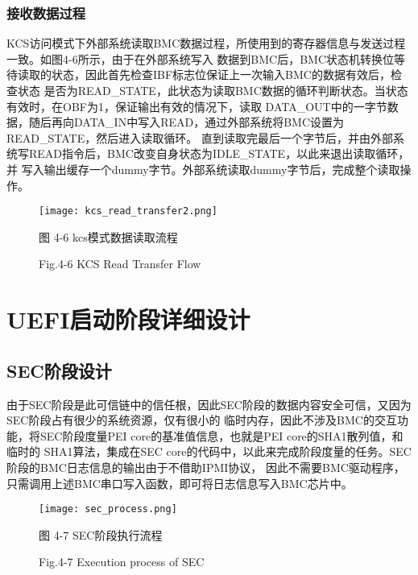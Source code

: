 \subsubsection{接收数据过程}
KCS访问模式下外部系统读取BMC数据过程，所使用到的寄存器信息与发送过程一致。如图4-6所示，由于在外部系统写入
数据到BMC后，BMC状态机转换位等待读取的状态，因此首先检查IBF标志位保证上一次输入BMC的数据有效后，检查状态
是否为READ\_STATE，此状态为读取BMC数据的循环判断状态。当状态有效时，在OBF为1，保证输出有效的情况下，读取
DATA\_OUT中的一字节数据，随后再向DATA\_IN中写入READ，通过外部系统将BMC设置为READ\_STATE，然后进入读取循环。
直到读取完最后一个字节后，并由外部系统写READ指令后，BMC改变自身状态为IDLE\_STATE，以此来退出读取循环，并
写入输出缓存一个dummy字节。外部系统读取dummy字节后，完成整个读取操作。

\begin{figure}[H]
    \vspace{0cm}   
    \setlength{\abovecaptionskip}{0.3cm}
	\centering
    \texttt{[image: kcs\_read\_transfer2.png]}
    \caption*{图 4-6 kcs模式数据读取流程}
    \setlength{\belowcaptionskip}{-0.7cm}
    \caption*{Fig.4-6 KCS Read Transfer Flow}
\end{figure}

%
%
\section{UEFI启动阶段详细设计}

\subsection{SEC阶段设计}
由于SEC阶段是此可信链中的信任根，因此SEC阶段的数据内容安全可信，又因为SEC阶段占有很少的系统资源，仅有很小的
临时内存，因此不涉及BMC的交互功能，将SEC阶段度量PEI core的基准值信息，也就是PEI core的SHA1散列值，和临时的
SHA1算法，集成在SEC core的代码中，以此来完成阶段度量的任务。SEC阶段的BMC日志信息的输出由于不借助IPMI协议，
因此不需要BMC驱动程序，只需调用上述BMC串口写入函数，即可将日志信息写入BMC芯片中。

\begin{figure}[h]
    \vspace{0cm}   
    \setlength{\abovecaptionskip}{0.3cm}
	\centering
    \texttt{[image: sec\_process.png]}
    \caption*{图 4-7 SEC阶段执行流程}
    \setlength{\belowcaptionskip}{-0.5cm}
    \caption*{Fig.4-7 Execution process of SEC}
\end{figure}

